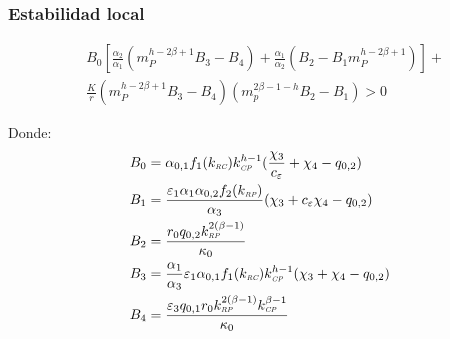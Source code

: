 \documentclass[11 pt,t]{beamer}
\newcommand{\CP}{\textit{\tiny CP}}
\newcommand{\RC}{\textit{\tiny RC}}
\newcommand{\RP}{\textit{\tiny RP}}
\begin{document}
\begin{frame}
  \frametitle{Estabilidad local}
  \begin{equation}
    \begin{aligned}
      &B_0 [ \frac{\alpha_2}{\alpha_1}(m_P^{h - 2 \beta + 1} B_3 - B_4) + \frac{\alpha_1}{\alpha_2}(B_2 - B_1m_P^{h - 2 \beta + 1})] + \\ &\frac{K}{r} (m_P^{h-2 \beta + 1} B_3 - B_4) (m_p^{2 \beta - 1 - h} B_2 - B_1)  > 0
      \end{aligned}
\end{equation}

Donde:
\begin{equation}
  \begin{aligned}
    B_0 &= \alpha_{0,1}f_1(k_{\RC})k_{\CP}^{h - 1} ( \frac{\chi_3}{c_\varepsilon} + \chi_4 - q_{0,2})\\
    B_1 &= \frac{\varepsilon_1 \alpha_1 \alpha_{0,2} f_2(k_{\RP})}{\alpha_3}(\chi_3 + c_\varepsilon \chi_4 - q_{0,2}) \\
    B_2 &= \frac{r_0 q_{0,2} k_{\RP}^{2(\beta - 1)} }{\kappa_0} \\
    B_3 &= \frac{\alpha_1}{\alpha_3} \varepsilon_1 \alpha_{0,1} f_1(k_{\RC}) k_{\CP}^{h - 1}(\chi_3 + \chi_4 - q_{0,2})\\
    B_4 &= \frac{\varepsilon_3 q_{0,1} r_0 k_{\RP}^{2(\beta - 1)} k_{\CP}^{\beta - 1}}{\kappa_0}
  \end{aligned}
\end{equation}
\end{frame}
\end{document}
